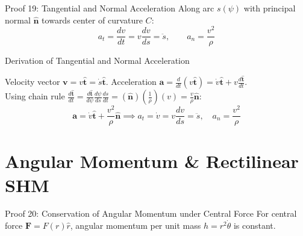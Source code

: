 \documentclass[11pt, a4paper]{report}
\begin{document}
\begin{theorembox}{Proof 19: Tangential and Normal Acceleration}
Along arc $s(\psi)$ with principal normal $\hat{\mathbf{n}}$ towards center of curvature $C$:
\begin{equation}
a_t = \frac{dv}{dt} = v \frac{dv}{ds} = \ddot{s}, \qquad a_n = \frac{v^2}{\rho}
\end{equation}
\end{theorembox}

\begin{proofbox}{Derivation of Tangential and Normal Acceleration}
\begin{center}
\end{center}

Velocity vector $\mathbf{v} = v \hat{\mathbf{t}} = \dot{s} \hat{\mathbf{t}}$. Acceleration $\mathbf{a} = \frac{d}{dt}(v \hat{\mathbf{t}}) = \dot{v} \hat{\mathbf{t}} + v \frac{d\hat{\mathbf{t}}}{dt}$.\\
Using chain rule $\frac{d\hat{\mathbf{t}}}{dt} = \frac{d\hat{\mathbf{t}}}{d\psi} \frac{d\psi}{ds} \frac{ds}{dt} = (\hat{\mathbf{n}}) \left(\frac{1}{\rho}\right) (v) = \frac{v}{\rho} \hat{\mathbf{n}}$:
\[
\mathbf{a} = \dot{v} \hat{\mathbf{t}} + \frac{v^2}{\rho} \hat{\mathbf{n}} \implies a_t = \dot{v} = v\frac{dv}{ds} = \ddot{s}, \quad a_n = \frac{v^2}{\rho}
\]
\end{proofbox}

\section{Angular Momentum \& Rectilinear SHM}

\begin{theorembox}{Proof 20: Conservation of Angular Momentum under Central Force}
For central force $\mathbf{F} = F(r)\hat{r}$, angular momentum per unit mass $h = r^2\dot{\theta}$ is constant.
\end{theorembox}
\end{document}
